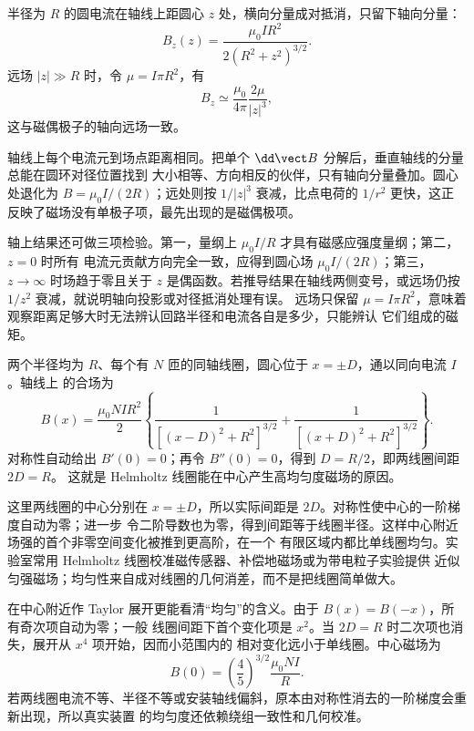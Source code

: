 \biotSavartDiagram

半径为 $R$ 的圆电流在轴线上距圆心 $z$ 处，横向分量成对抵消，只留下轴向分量：
\begin{equation}
  \boxed{B_z(z)=\frac{\mu_0IR^2}{2(R^2+z^2)^{3/2}}}.
\end{equation}
远场 $|z|\gg R$ 时，令 $\mu=I\pi R^2$，有
\begin{equation}
  B_z\simeq\frac{\mu_0}{4\pi}\frac{2\mu}{|z|^3},
\end{equation}
这与磁偶极子的轴向远场一致。

轴线上每个电流元到场点距离相同。把单个 $\dd\vect B$ 分解后，垂直轴线的分量总能在圆环对径位置找到
大小相等、方向相反的伙伴，只有轴向分量叠加。圆心处退化为 $B=\mu_0I/(2R)$；远处则按 $1/|z|^3$
衰减，比点电荷的 $1/r^2$ 更快，这正反映了磁场没有单极子项，最先出现的是磁偶极项。

轴上结果还可做三项检验。第一，量纲上 $\mu_0I/R$ 才具有磁感应强度量纲；第二，$z=0$ 时所有
电流元贡献方向完全一致，应得到圆心场 $\mu_0I/(2R)$；第三，$z\to\infty$ 时场趋于零且关于 $z$
是偶函数。若推导结果在轴线两侧变号，或远场仍按 $1/z^2$ 衰减，就说明轴向投影或对径抵消处理有误。
远场只保留 $\mu=I\pi R^2$，意味着观察距离足够大时无法辨认回路半径和电流各自是多少，只能辨认
它们组成的磁矩。

\loopAxisDiagram

两个半径均为 $R$、每个有 $N$ 匝的同轴线圈，圆心位于 $x=\pm D$，通以同向电流 $I$。轴线上
的合场为
\begin{equation}
  B(x)=\frac{\mu_0NIR^2}{2}
  \left\{
  \frac{1}{[(x-D)^2+R^2]^{3/2}}
  +\frac{1}{[(x+D)^2+R^2]^{3/2}}
  \right\}.
\end{equation}
对称性自动给出 $B'(0)=0$；再令 $B''(0)=0$，得到 $D=R/2$，即两线圈间距 $2D=R$。
这就是 Helmholtz 线圈能在中心产生高均匀度磁场的原因。

这里两线圈的中心分别在 $x=\pm D$，所以实际间距是 $2D$。对称性使中心的一阶梯度自动为零；进一步
令二阶导数也为零，得到间距等于线圈半径。这样中心附近场强的首个非零空间变化被推到更高阶，在一个
有限区域内都比单线圈均匀。实验室常用 Helmholtz 线圈校准磁传感器、补偿地磁场或为带电粒子实验提供
近似匀强磁场；均匀性来自成对线圈的几何消差，而不是把线圈简单做大。

在中心附近作 Taylor 展开更能看清“均匀”的含义。由于 $B(x)=B(-x)$，所有奇次项自动为零；一般
线圈间距下首个变化项是 $x^2$。当 $2D=R$ 时二次项也消失，展开从 $x^4$ 项开始，因而小范围内的
相对变化远小于单线圈。中心磁场为
\begin{equation}
  B(0)=\left(\frac45\right)^{3/2}\frac{\mu_0NI}{R}.
\end{equation}
若两线圈电流不等、半径不等或安装轴线偏斜，原本由对称性消去的一阶梯度会重新出现，所以真实装置
的均匀度还依赖绕组一致性和几何校准。

